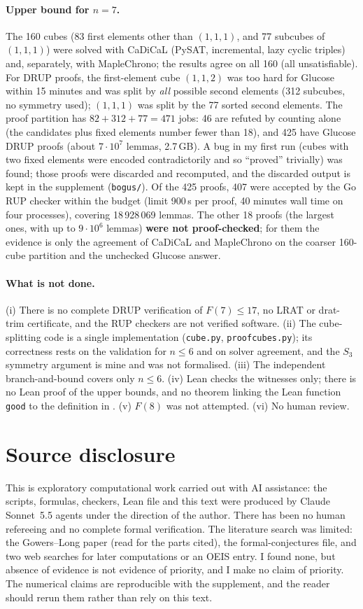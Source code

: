 \documentclass[11pt]{article}
\begin{document}
\paragraph{Upper bound for $n=7$.} The 160 cubes (83 first elements other than $(1,1,1)$, and 77 subcubes of $(1,1,1)$) were solved with CaDiCaL (PySAT, incremental, lazy cyclic triples) and, separately, with MapleChrono; the results agree on all 160 (all unsatisfiable). For DRUP proofs, the first-element cube $(1,1,2)$ was too hard for Glucose within 15 minutes and was split by \emph{all} possible second elements (312 subcubes, no symmetry used); $(1,1,1)$ was split by the 77 sorted second elements. The proof partition has $82+312+77=471$ jobs: 46 are refuted by counting alone (the candidates plus fixed elements number fewer than 18), and 425 have Glucose DRUP proofs (about $7\cdot10^{7}$ lemmas, 2.7\,GB). A bug in my first run (cubes with two fixed elements were encoded contradictorily and so ``proved'' trivially) was found; those proofs were discarded and recomputed, and the discarded output is kept in the supplement (\texttt{bogus/}). Of the 425 proofs, 407 were accepted by the Go RUP checker within the budget (limit 900\,s per proof, 40 minutes wall time on four processes), covering 18\,928\,069 lemmas. The other 18 proofs (the largest ones, with up to $9\cdot10^6$ lemmas) \textbf{were not proof-checked}; for them the evidence is only the agreement of CaDiCaL and MapleChrono on the coarser 160-cube partition and the unchecked Glucose answer.

\paragraph{What is not done.} (i) There is no complete DRUP verification of $F(7)\le17$, no LRAT or drat-trim certificate, and the RUP checkers are not verified software. (ii) The cube-splitting code is a single implementation (\texttt{cube.py}, \texttt{proofcubes.py}); its correctness rests on the validation for $n\le6$ and on solver agreement, and the $S_3$ symmetry argument is mine and was not formalised. (iii) The independent branch-and-bound covers only $n\le6$. (iv) Lean checks the witnesses only; there is no Lean proof of the upper bounds, and no theorem linking the Lean function \texttt{good} to the definition in \cite{fc}. (v) $F(8)$ was not attempted. (vi) No human review.

\section{Source disclosure}
This is exploratory computational work carried out with AI assistance: the scripts, formulas, checkers, Lean file and this text were produced by Claude Sonnet~5.5 agents under the direction of the author. There has been no human refereeing and no complete formal verification. The literature search was limited: the Gowers--Long paper (read for the parts cited), the formal-conjectures file, and two web searches for later computations or an OEIS entry. I found none, but absence of evidence is not evidence of priority, and I make no claim of priority. The numerical claims are reproducible with the supplement, and the reader should rerun them rather than rely on this text.
\end{document}
